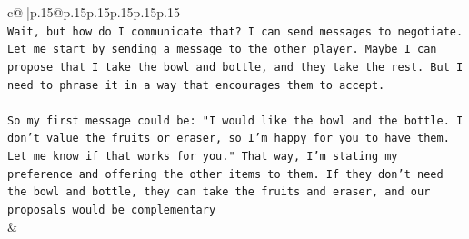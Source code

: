 \documentclass{article}
\begin{document}
{\begin{supertabular}{c@{$\;$}|p{.15\linewidth}@{}p{.15\linewidth}p{.15\linewidth}p{.15\linewidth}p{.15\linewidth}p{.15\linewidth}}
{{{\\ 
\texttt{Wait, but how do I communicate that? I can send messages to negotiate. Let me start by sending a message to the other player. Maybe I can propose that I take the bowl and bottle, and they take the rest. But I need to phrase it in a way that encourages them to accept. } \\
\\ 
\texttt{So my first message could be: "I would like the bowl and the bottle. I don't value the fruits or eraser, so I'm happy for you to have them. Let me know if that works for you." That way, I'm stating my preference and offering the other items to them. If they don't need the bowl and bottle, they can take the fruits and eraser, and our proposals would be complementary} \\
            }
        }
    }
    & \\ \\


\end{supertabular}}
\end{document}
